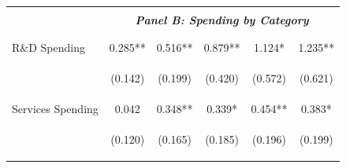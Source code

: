 \documentclass[dv_diss_main.tex]{subfiles}
\begin{document}
\begin{table}[H]
\begin{center}
{\begin{tabular}{lccccc}
    \cmidrule{2-6}
    \vspace{-1.5pt} & \vspace{-1.5pt} & \vspace{-1.5pt} & \vspace{-1.5pt} & \vspace{-1.5pt} \\
    & \multicolumn{5}{c}{\textit{\textbf{Panel B: Spending by Category}}} \\ 
    \vspace{-1.5pt} & \vspace{-1.5pt} & \vspace{-1.5pt} & \vspace{-1.5pt} & \vspace{-1.5pt} \\ 
    \cmidrule{2-6}
    \vspace{-1.5pt} & \vspace{-1.5pt} & \vspace{-1.5pt} & \vspace{-1.5pt} & \vspace{-1.5pt} \\
    R\&D Spending & 0.285** & 0.516** & 0.879** & 1.124* & 1.235** \\
    \vspace{4pt} & \begin{footnotesize}(0.142)\end{footnotesize} & \begin{footnotesize}(0.199)\end{footnotesize} & \begin{footnotesize}(0.420)\end{footnotesize} & \begin{footnotesize}(0.572)\end{footnotesize} & \begin{footnotesize}(0.621)\end{footnotesize} \\
    Services Spending & 0.042 & 0.348** & 0.339* & 0.454** & 0.383* \\
    \vspace{4pt} & \begin{footnotesize}(0.120)\end{footnotesize} & \begin{footnotesize}(0.165)\end{footnotesize} & \begin{footnotesize}(0.185)\end{footnotesize} & \begin{footnotesize}(0.196)\end{footnotesize} & \begin{footnotesize}(0.199)\end{footnotesize} \\

\end{tabular}}
\end{center}
\end{table}
\end{document}
